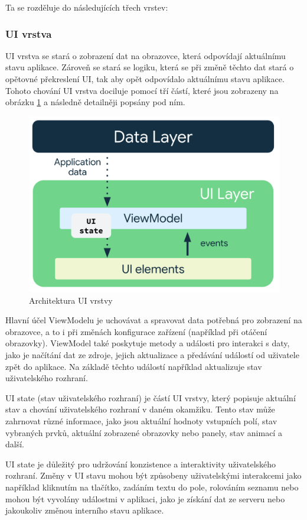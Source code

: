 Ta se rozděluje do následujících třech vrstev:

\subsubsection*{UI vrstva} \label{UILayerNavrh}
UI vrstva se stará o zobrazení dat na obrazovce, která odpovídají aktuálnímu stavu aplikace. Zároveň se stará se logiku, která
se při změně těchto dat stará o opětovné překreslení UI, tak aby opět odpovídalo aktuálnímu stavu aplikace. Tohoto chování UI vrstva 
dociluje pomocí tří částí, které jsou zobrazeny na obrázku \ref{fig:arch_ui_udf} a následně detailněji popsány pod ním.

\begin{figure}[H]
  \centering
  \includegraphics[width=.5\textwidth]{arch-ui-udf.png}
  \caption{Architektura UI vrstvy}
  \label{fig:arch_ui_udf}
\end{figure}

Hlavní účel ViewModelu je uchovávat a spravovat data potřebná pro zobrazení na obrazovce, a to i při změnách konfigurace zařízení 
(například při otáčení obrazovky). ViewModel také poskytuje metody a události pro interakci s daty, jako je načítání dat ze zdroje, 
jejich aktualizace a předávání událostí od uživatele zpět do aplikace. Na základě těchto událostí například aktualizuje stav uživatelského
rozhraní. %

 \label{UIStateParagraph}
UI state (stav uživatelského rozhraní) je částí UI vrstvy, který popisuje aktuální stav a chování uživatelského 
rozhraní v daném okamžiku. Tento stav může zahrnovat různé informace, jako jsou aktuální hodnoty vstupních polí, stav vybraných prvků,
 aktuální zobrazené obrazovky nebo panely, stav animací a další.

UI state je důležitý pro udržování konzistence a interaktivity uživatelského rozhraní. Změny v UI stavu mohou být způsobeny uživatelskými
interakcemi jako například kliknutím na tlačítko, zadáním textu do pole, rolováním seznamu nebo mohou být vyvolány událostmi v aplikaci,
jako je získání dat ze serveru nebo jakoukoliv změnou interního stavu aplikace. 

